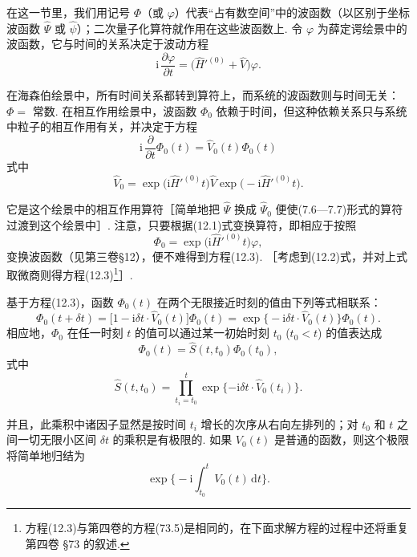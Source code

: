 在这一节里，我们用记号 $\varPhi$（或 $\varphi$）代表“占有数空间”中的波函数（以区别于坐标波函数 $\hat\Psi$ 或 $\hat\psi$）；二次量子化算符就作用在这些波函数上. 令 $\varphi$ 为薛定谔绘景中的波函数，它与时间的关系决定于波动方程
\begin{equation}
\mathrm{i}\,\frac{\partial\varphi}{\partial t}=\big(\hat H'^{(0)}+\hat V\big)\varphi.
\end{equation}

在海森伯绘景中，所有时间关系都转到算符上，而系统的波函数则与时间无关：$\varPhi=$ 常数. 在相互作用绘景中，波函数 $\varPhi_0$ 依赖于时间，但这种依赖关系只与系统中粒子的相互作用有关，并决定于方程
\begin{equation}
\mathrm{i}\,\frac{\partial}{\partial t}\varPhi_0(t)=\hat V_0(t)\varPhi_0(t)
\end{equation}
式中
\begin{equation}
\hat V_0=\exp\big(\mathrm{i}\hat H'^{(0)}t\big)\hat V\exp\big(-\mathrm{i}\hat H'^{(0)}t\big).
\end{equation}

它是这个绘景中的相互作用算符［简单地把 $\hat\Psi$ 换成 $\hat\Psi_0$ 便使(7.6—7.7)形式的算符过渡到这个绘景中］. 注意，只要根据(12.1)式变换算符，即相应于按照
\begin{equation}
\varPhi_0=\exp\big(\mathrm{i}\hat H'^{(0)}t\big)\varphi,
\end{equation}
变换波函数（见第三卷§12），便不难得到方程(12.3). ［考虑到(12.2)式，并对上式取微商则得方程(12.3)\footnote{方程(12.3)与第四卷的方程(73.5)是相同的，在下面求解方程的过程中还将重复第四卷 §73 的叙述.}］.

基于方程(12.3)，函数 $\varPhi_0(t)$ 在两个无限接近时刻的值由下列等式相联系：
\begin{equation*}
\varPhi_0(t+\delta t)=\big[1-\mathrm{i}\delta t\cdot\hat V_0(t)\big]\varPhi_0(t)=\exp\big\{-\mathrm{i}\delta t\cdot\hat V_0(t)\big\}\varPhi_0(t).
\end{equation*}
相应地，$\varPhi_0$ 在任一时刻 $t$ 的值可以通过某一初始时刻 $t_0$ ($t_0<t$) 的值表达成
\begin{equation}
\varPhi_0(t)=\hat S(t,t_0)\varPhi_0(t_0),
\end{equation}
式中
\begin{equation}
\hat S(t,t_0)=\prod_{t_i=t_0}^{t}\exp\{-\mathrm{i}\delta t\cdot\hat V_0(t_i)\}.
\end{equation}

并且，此乘积中诸因子显然是按时间 $t_i$ 增长的次序从右向左排列的；对 $t_0$ 和 $t$ 之间一切无限小区间 $\delta t$ 的乘积是有极限的. 如果 $V_0(t)$ 是普通的函数，则这个极限将简单地归结为
\begin{equation*}
\exp\Big\{-\mathrm{i}\int_{t_0}^{t}V_0(t)\,\mathrm{d}t\Big\}.
\end{equation*}

